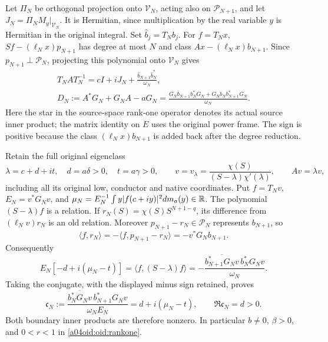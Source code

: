 \documentclass[11pt,a4paper]{article}
\begin{document}
Let $\Pi_N$ be orthogonal projection onto $\mathcal V_N$, acting
also on $\mathcal P_{N+1}$, and let
$J_N=\Pi_N M_y|_{\mathcal V_N}$. It is Hermitian, since
multiplication by the real variable $y$ is Hermitian in the original
integral. Set $\widehat b_j=T_Nb_j$. For $f=T_Nx$,
$Sf-(\ell_Nx)p_{N+1}$ has degree at most $N$ and class
$Ax-(\ell_Nx)b_{N+1}$. Since $p_{N+1}\perp\mathcal P_N$,
projecting this polynomial onto $\mathcal V_N$ gives
\begin{equation}\label{a04oid:oid:action}
 \begin{gathered}
 T_NAT_N^{-1}=cI+iJ_N+
 \frac{\widehat b_{N+1}\widehat b_N^*}{\omega_N},\\
 D_N:=A^*G_N+G_NA-aG_N
 =\frac{G_Nb_{N+1}b_N^*G_N+G_Nb_Nb_{N+1}^*G_N}{\omega_N}.
 \end{gathered}
\end{equation}
Here the star in the source-space rank-one operator denotes its
actual source inner product; the matrix identity on $E$ uses the
original power frame. The sign is positive because the class
$(\ell_Nx)b_{N+1}$ is added back after the degree reduction.

Retain the full original eigenclass
\begin{equation}\label{a04oid:oid:eigen}
 \lambda=c+d+it,\quad d=a\delta>0,\quad t=a\gamma>0,
 \qquad v=v_\lambda=\frac{\chi(S)}{(S-\lambda)\chi'(\lambda)},
 \qquad Av=\lambda v,
\end{equation}
including all its original low, conductor and native coordinates.
Put $f=T_Nv$, $E_N=v^*G_Nv$, and
$\mu_N=E_N^{-1}\int y|f(c+iy)|^2dm_a(y)\in\mathbb R$.
The polynomial $(S-\lambda)f$ is a relation. If
$r_N(S)=\chi(S)S^{N+1-q}$, its difference from
$(\ell_Nv)r_N$ is an old relation. Moreover
$p_{N+1}-r_N\in\mathcal P_N$ represents $b_{N+1}$, so
\[
 \langle f,r_N\rangle=-\langle f,p_{N+1}-r_N\rangle
 =-v^*G_Nb_{N+1}.
\]
Consequently
\[
 E_N[-d+i(\mu_N-t)]
 =\langle f,(S-\lambda)f\rangle
 =-\frac{\overline{b_{N+1}^*G_Nv}\,b_N^*G_Nv}{\omega_N}.
\]
Taking the conjugate, with the displayed minus sign retained, proves
\begin{equation}\label{a04oid:oid:current}
 \mathfrak c_N
 :=\frac{\overline{b_N^*G_Nv}\,b_{N+1}^*G_Nv}
 {\omega_NE_N}
 =d+i(\mu_N-t),\qquad \Re\mathfrak c_N=d>0.
\end{equation}
Both boundary inner products are therefore nonzero. In particular
$b\ne0$, $\beta>0$, and $0<r<1$ in \eqref{a04oid:oid:rankone}.
\end{document}
